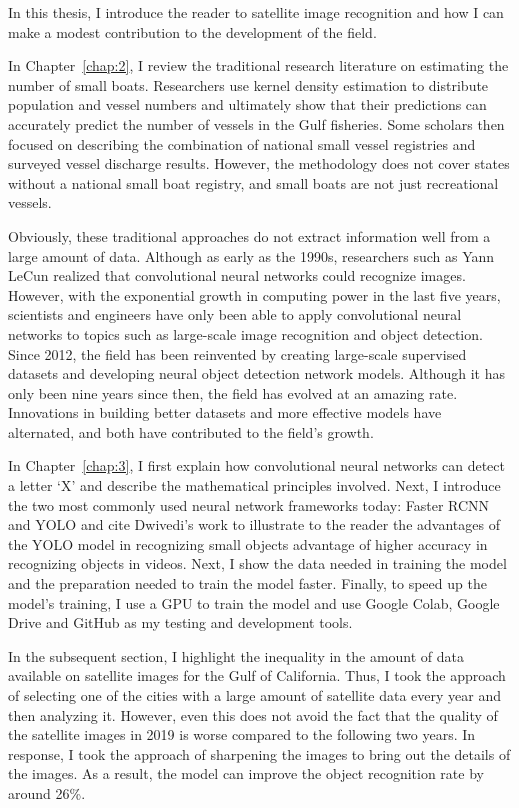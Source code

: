 
In this thesis, I introduce the reader to satellite image recognition and how I can make a modest contribution to the development of the field.

In Chapter~\ref{chap:2}, I review the traditional research literature on estimating the number of small boats. Researchers use kernel density estimation to distribute population and vessel numbers and ultimately show that their predictions can accurately predict the number of vessels in the Gulf fisheries. Some scholars then focused on describing the combination of national small vessel registries and surveyed vessel discharge results. However, the methodology does not cover states without a national small boat registry, and small boats are not just recreational vessels.

Obviously, these traditional approaches do not extract information well from a large amount of data. Although as early as the 1990s, researchers such as Yann LeCun realized that convolutional neural networks could recognize images. However, with the exponential growth in computing power in the last five years, scientists and engineers have only been able to apply convolutional neural networks to topics such as large-scale image recognition and object detection. Since 2012, the field has been reinvented by creating large-scale supervised datasets and developing neural object detection network models. Although it has only been nine years since then, the field has evolved at an amazing rate. Innovations in building better datasets and more effective models have alternated, and both have contributed to the field's growth.

In Chapter~\ref{chap:3}, I first explain how convolutional neural networks can detect a letter `X' and describe the mathematical principles involved. Next, I introduce the two most commonly used neural network frameworks today: Faster RCNN and YOLO and cite Dwivedi's work to illustrate to the reader the advantages of the YOLO model in recognizing small objects advantage of higher accuracy in recognizing objects in videos. Next, I show the data needed in training the model and the preparation needed to train the model faster. Finally, to speed up the model's training, I use a GPU to train the model and use Google Colab, Google Drive and GitHub as my testing and development tools.


In the subsequent section, I highlight the inequality in the amount of data available on satellite images for the Gulf of California. Thus, I took the approach of selecting one of the cities with a large amount of satellite data every year and then analyzing it. However, even this does not avoid the fact that the quality of the satellite images in 2019 is worse compared to the following two years. In response, I took the approach of sharpening the images to bring out the details of the images. As a result, the model can improve the object recognition rate by around 26\%.

